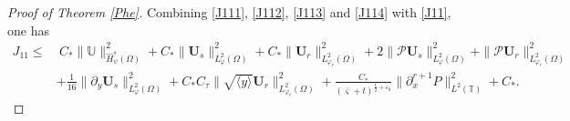 \documentclass{amsart}
\numberwithin{equation}{section}
\newcommand\y{{{\langle y \rangle}}}
\begin{document}
\begin{proof}[Proof of Theorem \ref{Phe}]
Combining \eqref{J111}, \eqref{J112}, \eqref{J113} and \eqref{J114} with \eqref{J11}, one has
\begin{align*}
J_{11}
\leq&~C_{*}\|\mathbb{U}\|_{\hat{H}_{\psi}^{s}(\Omega)}^{2}
     +C_{*}\|\mathbf{U}_{s}\|_{L_{\varphi}^{2}(\Omega)}^{2}
     +C_{*}\|\mathbf{U}_{r}\|_{L_{\varphi_{r}}^{2}(\Omega)}^{2}
     +2\|\mathcal{P}\mathbf{U}_{s}\|_{L_{\varphi}^{2}(\Omega)}^{2}
     +\|\mathcal{P}\mathbf{U}_{r}\|_{L_{\varphi_{r}}^{2}(\Omega)}^{2}\nonumber\\
    &+\frac{1}{16}\|\partial_{y}\mathbf{U}_{s}\|_{L_{\varphi}^{2}(\Omega)}^{2}
     +C_{*}C_{\tau}\|\sqrt{\y}\mathbf{U}_{r}\|_{L_{\varphi_{r}}^{2}(\Omega)}^{2}
     +\frac{C_{*}}{(\bar{\varsigma}+t)^{\frac{1}{2}+\varepsilon_{0}}}\|\partial_{x}^{r+1}P\|_{L^{2}(\mathbb{T})}^{2}
     +C_{*}.
\end{align*}



\end{proof}
\end{document}
